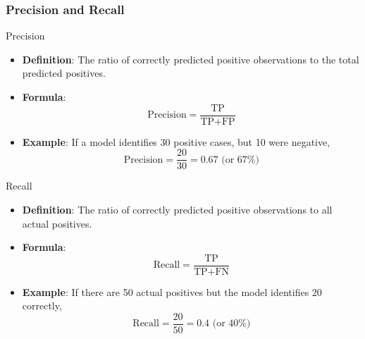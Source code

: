 \documentclass[aspectratio=169]{beamer}
\begin{document}
\begin{frame}[fragile]
    \frametitle{Precision and Recall}
    \begin{block}{Precision}
        \begin{itemize}
            \item \textbf{Definition}: The ratio of correctly predicted positive observations to the total predicted positives.
            \item \textbf{Formula}: 
            \begin{equation}
                \text{Precision} = \frac{\text{TP}}{\text{TP} + \text{FP}}
            \end{equation}
            \item \textbf{Example}: If a model identifies 30 positive cases, but 10 were negative, 
            \[
            \text{Precision} = \frac{20}{30} = 0.67 \text{ (or 67\%)}
            \]
        \end{itemize}
    \end{block}
    
    \begin{block}{Recall}
        \begin{itemize}
            \item \textbf{Definition}: The ratio of correctly predicted positive observations to all actual positives.
            \item \textbf{Formula}:
            \begin{equation}
                \text{Recall} = \frac{\text{TP}}{\text{TP} + \text{FN}}
            \end{equation}
            \item \textbf{Example}: If there are 50 actual positives but the model identifies 20 correctly, 
            \[
            \text{Recall} = \frac{20}{50} = 0.4 \text{ (or 40\%)}
            \]
        \end{itemize}
    \end{block}
\end{frame}
\end{document}
